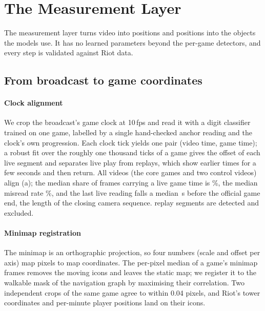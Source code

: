 \section{The Measurement Layer}
\label{sec:measurement}

The measurement layer turns video into positions and positions into the objects the models use.
It has no learned parameters beyond the per-game detectors, and every step is validated against Riot data.

\subsection{From broadcast to game coordinates}

\paragraph*{Clock alignment}
We crop the broadcast's game clock at 10\,fps and read it with a digit classifier trained on one game, labelled by a single hand-checked anchor reading and the clock's own progression.
Each clock tick yields one pair (video time, game time); a robust fit over the roughly one thousand ticks of a game gives the offset of each live segment and separates live play from replays, which show earlier times for a few seconds and then return.
All  videos (the  core games and two control videos) align (a); the median share of frames carrying a live game time is \%, the median misread rate \%, and the last live reading falls a median \,s before the official game end, the length of the closing camera sequence.
 replay segments are detected and excluded.

\paragraph*{Minimap registration}
The minimap is an orthographic projection, so four numbers (scale and offset per axis) map pixels to map coordinates.
The per-pixel median of a game's minimap frames removes the moving icons and leaves the static map; we register it to the walkable mask of the navigation graph by maximising their correlation.
Two independent crops of the same game agree to within 0.04 pixels, and Riot's tower coordinates and per-minute player positions land on their icons.

